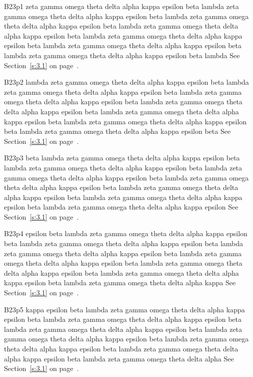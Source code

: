 B23p1 zeta gamma omega theta delta alpha kappa epsilon beta lambda zeta gamma omega theta delta alpha kappa epsilon beta lambda zeta gamma omega theta delta alpha kappa epsilon beta lambda zeta gamma omega theta delta alpha kappa epsilon beta lambda zeta gamma omega theta delta alpha kappa epsilon beta lambda zeta gamma omega theta delta alpha kappa epsilon beta lambda zeta gamma omega theta delta alpha kappa epsilon beta lambda See Section~\ref{s:3.1} on page~\pageref{s:3.1}.

B23p2 lambda zeta gamma omega theta delta alpha kappa epsilon beta lambda zeta gamma omega theta delta alpha kappa epsilon beta lambda zeta gamma omega theta delta alpha kappa epsilon beta lambda zeta gamma omega theta delta alpha kappa epsilon beta lambda zeta gamma omega theta delta alpha kappa epsilon beta lambda zeta gamma omega theta delta alpha kappa epsilon beta lambda zeta gamma omega theta delta alpha kappa epsilon beta See Section~\ref{s:3.1} on page~\pageref{s:3.1}.

B23p3 beta lambda zeta gamma omega theta delta alpha kappa epsilon beta lambda zeta gamma omega theta delta alpha kappa epsilon beta lambda zeta gamma omega theta delta alpha kappa epsilon beta lambda zeta gamma omega theta delta alpha kappa epsilon beta lambda zeta gamma omega theta delta alpha kappa epsilon beta lambda zeta gamma omega theta delta alpha kappa epsilon beta lambda zeta gamma omega theta delta alpha kappa epsilon See Section~\ref{s:3.1} on page~\pageref{s:3.1}.

B23p4 epsilon beta lambda zeta gamma omega theta delta alpha kappa epsilon beta lambda zeta gamma omega theta delta alpha kappa epsilon beta lambda zeta gamma omega theta delta alpha kappa epsilon beta lambda zeta gamma omega theta delta alpha kappa epsilon beta lambda zeta gamma omega theta delta alpha kappa epsilon beta lambda zeta gamma omega theta delta alpha kappa epsilon beta lambda zeta gamma omega theta delta alpha kappa See Section~\ref{s:3.1} on page~\pageref{s:3.1}.

B23p5 kappa epsilon beta lambda zeta gamma omega theta delta alpha kappa epsilon beta lambda zeta gamma omega theta delta alpha kappa epsilon beta lambda zeta gamma omega theta delta alpha kappa epsilon beta lambda zeta gamma omega theta delta alpha kappa epsilon beta lambda zeta gamma omega theta delta alpha kappa epsilon beta lambda zeta gamma omega theta delta alpha kappa epsilon beta lambda zeta gamma omega theta delta alpha See Section~\ref{s:3.1} on page~\pageref{s:3.1}.

